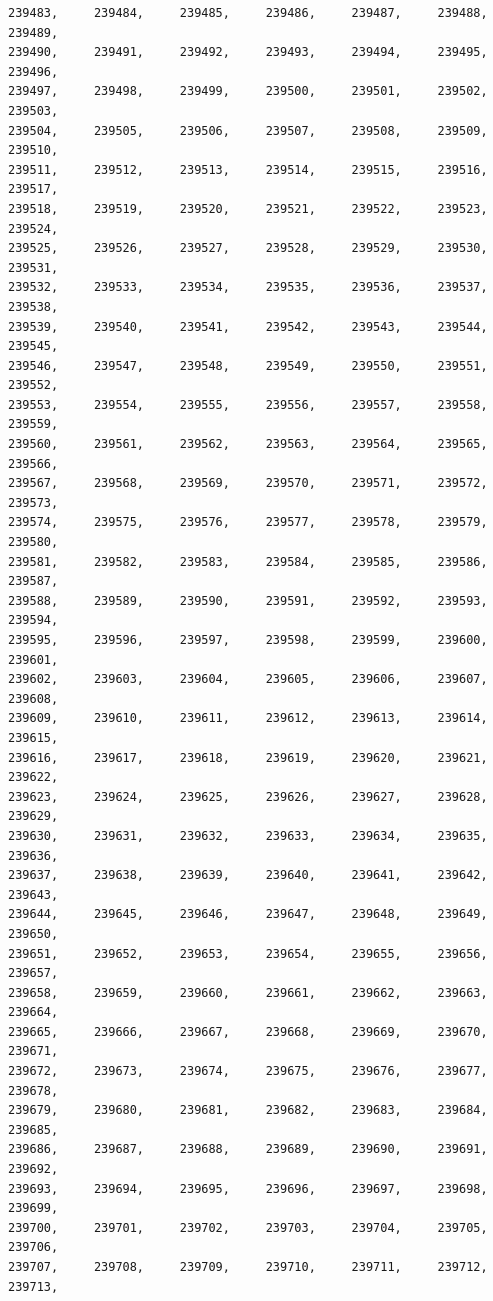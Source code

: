 \documentclass[a4paper,11pt]{report}
\begin{document}
\begin{verbatim}
239483,     239484,     239485,     239486,     239487,     239488,     239489,
239490,     239491,     239492,     239493,     239494,     239495,     239496,
239497,     239498,     239499,     239500,     239501,     239502,     239503,
239504,     239505,     239506,     239507,     239508,     239509,     239510,
239511,     239512,     239513,     239514,     239515,     239516,     239517,
239518,     239519,     239520,     239521,     239522,     239523,     239524,
239525,     239526,     239527,     239528,     239529,     239530,     239531,
239532,     239533,     239534,     239535,     239536,     239537,     239538,
239539,     239540,     239541,     239542,     239543,     239544,     239545,
239546,     239547,     239548,     239549,     239550,     239551,     239552,
239553,     239554,     239555,     239556,     239557,     239558,     239559,
239560,     239561,     239562,     239563,     239564,     239565,     239566,
239567,     239568,     239569,     239570,     239571,     239572,     239573,
239574,     239575,     239576,     239577,     239578,     239579,     239580,
239581,     239582,     239583,     239584,     239585,     239586,     239587,
239588,     239589,     239590,     239591,     239592,     239593,     239594,
239595,     239596,     239597,     239598,     239599,     239600,     239601,
239602,     239603,     239604,     239605,     239606,     239607,     239608,
239609,     239610,     239611,     239612,     239613,     239614,     239615,
239616,     239617,     239618,     239619,     239620,     239621,     239622,
239623,     239624,     239625,     239626,     239627,     239628,     239629,
239630,     239631,     239632,     239633,     239634,     239635,     239636,
239637,     239638,     239639,     239640,     239641,     239642,     239643,
239644,     239645,     239646,     239647,     239648,     239649,     239650,
239651,     239652,     239653,     239654,     239655,     239656,     239657,
239658,     239659,     239660,     239661,     239662,     239663,     239664,
239665,     239666,     239667,     239668,     239669,     239670,     239671,
239672,     239673,     239674,     239675,     239676,     239677,     239678,
239679,     239680,     239681,     239682,     239683,     239684,     239685,
239686,     239687,     239688,     239689,     239690,     239691,     239692,
239693,     239694,     239695,     239696,     239697,     239698,     239699,
239700,     239701,     239702,     239703,     239704,     239705,     239706,
239707,     239708,     239709,     239710,     239711,     239712,     239713,

\end{verbatim}
\end{document}
